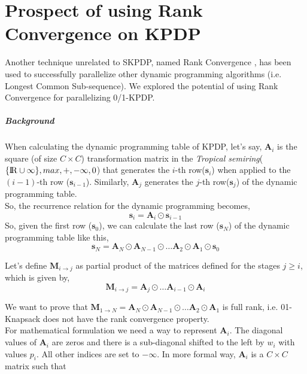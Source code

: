 \chapter{Prospect of using Rank Convergence on KPDP}
\label{chap:rank convergence}

Another technique unrelated to SKPDP, named Rank Convergence \cite{Maleki:2016:EPU:3001840.2983553}, has been used to successfully parallelize other  dynamic programming algorithms (i.e. Longest Common Sub-sequence). We explored the potential of using Rank Convergence for parallelizing 0/1-KPDP.



\paragraph{Background}
When calculating the dynamic programming table of KPDP, let's say, $\mathbf{A}_i$ is the square (of size $C\times C$) transformation matrix in the \textit{Tropical semiring}($\{{\rm I\!R}\cup \infty\},max,+,-\infty,0$) that generates the $i$-th row($\mathbf{s}_i$) when applied to the $(i-1)$-th row ($\mathbf{s}_{i-1}$). Similarly, $\mathbf{A}_j$ generates the $j$-th row($\mathbf{s}_j$) of the dynamic programming table. \\
So, the recurrence relation for the dynamic programming becomes,
\[
\mathbf{s}_i = \mathbf{A}_i \odot \mathbf{s}_{i-1}
\]
So, given the first row ($\mathbf{s}_0$), we can calculate the last row ($\mathbf{s}_N$) of the dynamic programming table like this,
\[
\mathbf{s}_N = \mathbf{A}_N \odot \mathbf{A}_{N-1} \odot  \dots \mathbf{A}_2 \odot \mathbf{A}_1 \odot  \mathbf{s}_0
\]

\noindent
Let's define $\mathbf{M}_{i \rightarrow j }$ as partial product of the matrices defined for the stages $j \geq i$, which is given by,
\[
\mathbf{M}_{i \rightarrow j } =  \mathbf{A}_j \odot  \dots \mathbf{A}_{i-1} \odot \mathbf{A}_i 
\]

\noindent
We want to prove that $\mathbf{M}_{1 \rightarrow N }=\mathbf{A}_N \odot \mathbf{A}_{N-1} \odot  \dots \mathbf{A}_2 \odot \mathbf{A}_1$ is full rank, i.e. 01-Knapsack does not have the rank convergence property.
\\
For mathematical formulation we need a way to represent $\mathbf{A}_i$. The diagonal values of $\mathbf{A}_i$ are zeros and there is a sub-diagonal shifted to the left by $w_i$ with values $p_i$. All other indices are set to $-\infty$. In more formal way, $\mathbf{A}_i$ is a $C \times C$ matrix such that 

